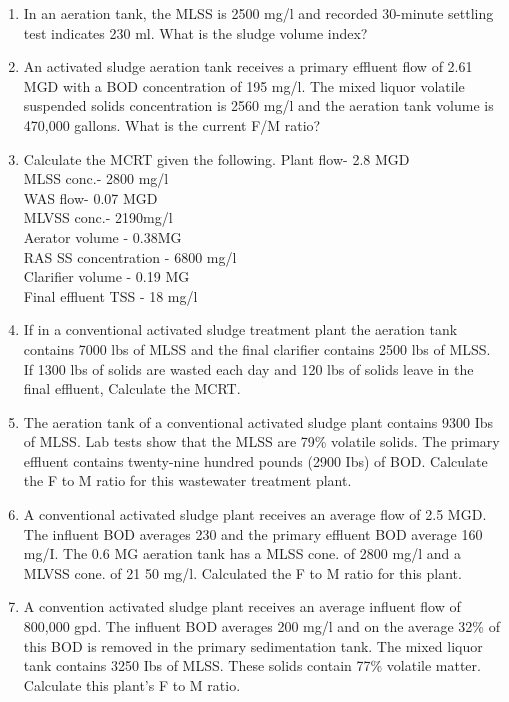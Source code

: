 \begin{enumerate}
\item In an aeration tank, the MLSS is 2500 mg/l and recorded 30-minute settling test indicates 230 ml.  What is the sludge volume index?



\item An activated sludge aeration tank receives a primary effluent flow of 2.61 MGD with a BOD concentration of 195 mg/l. The mixed liquor volatile suspended solids concentration is 2560 mg/l and the aeration tank volume is 470,000 gallons. What is the current F/M ratio?

\item Calculate the MCRT given the following.
Plant flow- 2.8 MGD\\ 		MLSS conc.- 2800 mg/l\\
WAS flow- 0.07 MGD\\ 		MLVSS conc.- 2190mg/l\\
Aerator volume - 0.38MG\\	RAS SS concentration - 6800 mg/l\\
Clarifier volume - 0.19 MG\\ 	Final effluent TSS - 18 mg/l\\


\item If in a conventional activated sludge treatment plant the aeration tank contains 7000 lbs of MLSS and the final clarifier contains 2500 lbs of MLSS.  If 1300 lbs of solids are wasted each day and 120 lbs of solids leave in the final effluent, Calculate the MCRT.

\item The aeration tank of a conventional activated sludge plant contains 9300 Ibs of MLSS. Lab tests show that the MLSS are 79\% volatile solids. The primary effluent contains twenty-nine hundred pounds (2900 Ibs) of BOD. Calculate the F to M ratio for this wastewater treatment plant.




\item A conventional activated sludge plant receives an average flow of 2.5 MGD. The influent BOD averages 230 and the primary effluent BOD average 160 mg/I. The 0.6 MG aeration tank has a MLSS cone. of 2800 mg/l and a MLVSS cone. of 21 50 mg/l. Calculated the F to M ratio for this plant.




\item A convention activated sludge plant receives an average influent flow of 800,000 gpd. The influent BOD averages 200 mg/l and on the average 32\% of this BOD is removed in the primary sedimentation tank. The mixed liquor tank contains 3250 Ibs of MLSS. These solids contain 77\% volatile matter. Calculate this plant's F to M ratio.


\end{enumerate}
